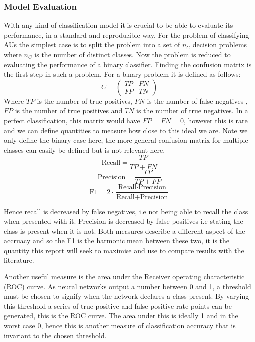 \documentclass[9pt]{article} \usepackage{amsmath, amsthm, amssymb}
\begin{document}
\subsubsection{Model Evaluation}
With any kind of classification model it is crucial to be able to evaluate its
performance, in a standard and reproducible way. For the problem of classifying
AUs the simplest case is to split the problem into a set of $n_C$ decision problems
where $n_C$ is the number of distinct classes. Now the problem is reduced to
evaluating the performance of a binary classifier. Finding the confusion matrix is
the first step in such a problem. For a binary problem it is defined as follows:
\begin{equation}
C =
\begin{pmatrix}
TP & FN\\
FP & TN
\end{pmatrix}
\end{equation}
Where $TP$ is the number of true positives, $FN$ is the number of false negatives
, $FP$ is the number of true positives and $TN$ is the number of true negatives.
In a perfect classification, this matrix would have $FP=FN=0$, however this is rare
and we can define quantities to measure how close to this ideal we are. Note we
only define the binary case here, the more general confusion matrix for multiple
classes can easily be defined but is not relevant here.
\begin{equation}
\text{Recall} = \frac{TP}{TP+FN}
\end{equation}
\begin{equation}
\text{Precision} = \frac{TP}{TP+FP}
\end{equation}
\begin{equation}
\text{F1} = 2 \cdot \frac{\text{Recall} \cdot \text{Precision}}{\text{Recall} + \text{Precision}}
\end{equation}

Hence recall is decreased by false negatives, i.e not being able to recall the class
when presented with it. Precision is decreased by false positives i.e stating the class
is present when it is not. Both measures describe a different aspect of the accruacy and so the F1 is the
harmonic mean between these two, it is the quantity this report will seek to maximise and use to compare
results with the literature.

Another useful measure is the area under the Receiver operating characteristic (ROC) curve.
As neural networks output a number between 0 and 1, a threshold must be chosen to signify 
when the network declares a class present. By varying this threshold a series of true positive and false positive rate points
can be generated, this is the ROC curve. The area under this is ideally 1 and in the worst case 0, hence this is
another measure of classification accuracy that is invariant to the chosen threshold.
\end{document}
